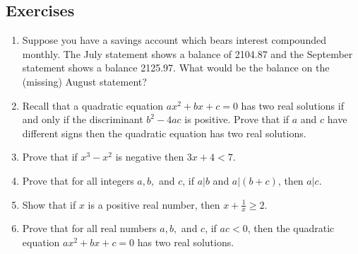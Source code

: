 \documentclass[10pt,]{book}
\theoremstyle{plain}
\theoremstyle{definition}
\theoremstyle{definition}
\numberwithin{equation}{section}
\newcommand{\hint}[1]{ }
\newcommand{\lt}{ < }
\begin{document}
\subsection[{Exercises}]{Exercises}\label{exercises-16}
\leavevmode%
\begin{enumerate}[label=(\alph*)]
\item\hypertarget{li-245}{}
          Suppose you have a savings account which bears interest 
          compounded monthly.  The July statement shows a balance of 
          \textdollar{} 2104.87 and the September statement shows a balance \textdollar{} 2125.97.
          What would be the balance on the (missing) August statement?

          \hint{A savings account where we are not depositing or withdrawing funds has a balance that is growing geometrically.}
\item\hypertarget{quad}{}
          Recall that a quadratic equation \(ax^2+bx+c=0\) has two real solutions
          if and only if the discriminant \(b^2-4ac\) is positive.  Prove that if 
          \(a\) and \(c\) have different signs then the quadratic equation has two 
          real solutions.

          \hint{You don't need all the hypotheses. If \(a\) and \(c\) have different signs, then \(ac\) is a negative quantity}
\item\hypertarget{li-247}{}
          Prove that if \(x^3-x^2\) is negative then \(3x+4 \lt  7\).

          \hint{This follows very easily by the method of working backwards from the conclusion. Remember that when multiplying or dividing both sides of an inequality by some number, the direction of the inequality may reverse (unless we know the number involved is positive).  Also, remember that we can't divide by zero, so if we are (just for example, don't know why I'm mentioning it really\dots{}) dividing both sides of an inequality by \(x^2\) then we must treat the case where \(x=0\) separately.}
\item\hypertarget{li-248}{}
          Prove that for all integers \(a,b,\) and \(c\), if \(a|b\) and \(a|(b+c)\), then
          \(a|c\).
\item\hypertarget{li-249}{}
          Show that if \(x\) is a positive real number, then \(x+\frac{1}{x} \geq 2\). 

          \hint{If you work backwards from the conclusion on this one, you should eventually come to the inequality \((x-1)^2 \geq 0\).  Notice that this inequality is always true \textemdash{} all squares are non-negative. When you go to write-up your proof (writing things in the forward direction), you'll want to acknowledge this truth. Start with something like ``Regardless of the value of \(x\), the quantity \((x-1)^2\) is greater than or equal to zero as it is a perfect square.''}
\item\hypertarget{li-250}{}
          Prove that for all real numbers \(a,b,\) and \(c\), if \(ac\lt 0\), then the quadratic
          equation \(ax^{2}+bx+c=0\) has two real solutions.


\end{enumerate}
\end{document}
